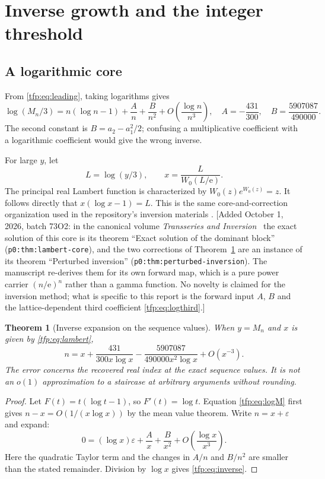 \documentclass[11pt,a4paper]{article}
\numberwithin{equation}{section}
\newtheorem{theorem}{Theorem}[section]
\theoremstyle{definition}\newtheorem{definition}[theorem]{Definition}
\theoremstyle{remark}\newtheorem{remark}[theorem]{Remark}
\newcommand{\ee}{\mathrm e}
\begin{document}
\section{Inverse growth and the integer threshold}\label{tfp:sec:inverse}
\subsection{A logarithmic core}
From \eqref{tfp:eq:leading}, taking logarithms gives
\begin{equation}\label{tfp:eq:logM}
 \log(M_n/3)
 =n(\log n-1)+\frac{A}{n}+\frac{B}{n^2}
                    +O\!\left(\frac{\log n}{n^3}\right),
 \quad A=-\frac{431}{300},\quad B=\frac{5907087}{490000}.
\end{equation}
The second constant is $B=a_2-a_1^2/2$; confusing a multiplicative
coefficient with a logarithmic coefficient would give the wrong inverse.

For large $y$, let
\begin{equation}\label{tfp:eq:lambert}
 L=\log(y/3),\qquad x=\frac{L}{W_0(L/\ee)}.
\end{equation}
The principal real Lambert function is characterized by
$W_0(z)e^{W_0(z)}=z$. It follows directly that
$x(\log x-1)=L$. This is the same core-and-correction organization used
in the repository's inversion materials \cite{transseries}.
[Added October 1, 2026, batch 73O2: in the canonical volume
\emph{Transseries and Inversion}~\cite{tai} the exact solution of this core
is its theorem ``Exact solution of the dominant block''
(\texttt{p0:thm:lambert-core}), and the two corrections of
Theorem~\ref{tfp:thm:inverse} are an instance of its theorem ``Perturbed
inversion'' (\texttt{p0:thm:perturbed-inversion}). The manuscript re-derives
them for its own forward map, which is a pure power carrier $(n/\ee)^n$
rather than a gamma function. No novelty is claimed for the inversion
method; what is specific to this report is the forward input $A$, $B$ and the
lattice-dependent third coefficient \eqref{tfp:eq:logthird}.]

\begin{theorem}[Inverse expansion on the sequence values]\label{tfp:thm:inverse}
When $y=M_n$ and $x$ is given by \eqref{tfp:eq:lambert},
\begin{equation}\label{tfp:eq:inverse}
 n=x+\frac{431}{300x\log x}
       -\frac{5907087}{490000x^2\log x}+O(x^{-3}).
\end{equation}
The error concerns the recovered real index at the exact sequence
values. It is not an $o(1)$ approximation to a staircase at arbitrary
arguments without rounding.
\end{theorem}
\begin{proof}
Let $F(t)=t(\log t-1)$, so $F'(t)=\log t$. Equation \eqref{tfp:eq:logM}
first gives $n-x=O(1/(x\log x))$ by the mean value theorem.
Write $n=x+\varepsilon$ and expand:
\[
 0=(\log x)\varepsilon+\frac A x+\frac B{x^2}
        +O\!\left(\frac{\log x}{x^3}\right).
\]
Here the quadratic Taylor term and the changes in $A/n$ and $B/n^2$
are smaller than the stated remainder. Division by $\log x$ gives
\eqref{tfp:eq:inverse}.
\end{proof}
\end{document}
